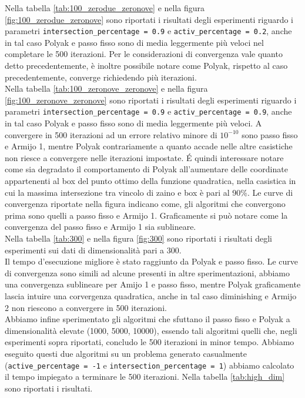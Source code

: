 \documentclass[12pt]{extarticle}
\begin{document}
Nella tabella \ref{tab:100_zerodue_zeronove} e nella figura \ref{fig:100_zerodue_zeronove} sono riportati i risultati degli esperimenti riguardo i parametri \texttt{intersection\_percentage = 0.9} e \texttt{activ\_percentage = 0.2}, anche in tal caso Polyak e passo fisso sono di media leggermente più veloci nel completare le 500 iterazioni. Per le considerazioni di convergenza vale quanto detto precedentemente, è inoltre possibile notare come Polyak, rispetto al caso precedentemente, converge richiedendo più iterazioni.\\
Nella tabella \ref{tab:100_zeronove_zeronove}  e nella figura \ref{fig:100_zeronove_zeronove}  sono riportati i risultati degli esperimenti riguardo i parametri \texttt{intersection\_percentage = 0.9} e \texttt{activ\_percentage = 0.9}, anche in tal caso Polyak e passo fisso sono di media leggermente più veloci. A convergere in 500 iterazioni ad un errore relativo minore di $10^{-10}$ sono passo fisso e Armijo 1, mentre Polyak contrariamente a quanto accade nelle altre casistiche non riesce a convergere nelle iterazioni impostate. \'E quindi interessare notare come sia degradato il comportamento di Polyak all'aumentare delle coordinate appartenenti al box del punto ottimo della funzione quadratica, nella casistica in cui la massima intersezione tra vincolo di zaino e box è pari al 90\%. Le curve di convergenza riportate nella figura indicano come, gli algoritmi che convergono prima sono quelli a passo fisso e Armijo 1. Graficamente si può notare come la convergenza del passo fisso e Armijo 1 sia sublineare.\\
Nella tabella \ref{tab:300} e nella figura \ref{fig:300} sono riportati i risultati degli esperimenti sui dati di dimensionalità pari a 300.\\
Il tempo d'esecuzione migliore è stato raggiunto da Polyak e passo fisso. Le curve di convergenza sono simili ad alcune presenti in altre sperimentazioni, abbiamo una convergenza sublineare per Amijo 1 e passo fisso, mentre Polyak graficamente lascia intuire una corvergenza quadratica, anche in tal caso diminishing e Armijo 2 non riescono a convergere in 500 iterazioni.\\
Abbiamo infine sperimentato gli algoritmi che sfuttano il passo fisso e Polyak a dimensionalità elevate (1000, 5000, 10000), essendo tali algoritmi quelli che, negli esperimenti sopra riportati, concludo le 500 iterazioni in minor tempo. Abbiamo eseguito questi due algoritmi su un problema generato casualmente (\texttt{active\_percentage = -1} e \texttt{intersection\_percentage = 1}) abbiamo calcolato il tempo impiegato a terminare le 500 iterazioni. Nella tabella \ref{tab:high_dim} sono riportati i risultati.\\
\end{document}
